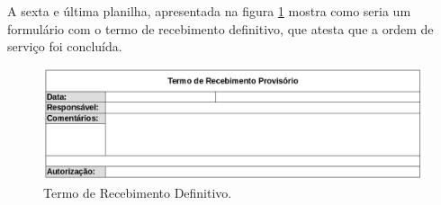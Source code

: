 A sexta e última planilha, apresentada na figura \ref{fig:prot_ack} mostra como
seria um formulário com o termo de recebimento definitivo, que atesta que a
ordem de serviço foi concluída.

\begin{figure}[H]
  \includegraphics[width=1.0\textwidth,natwidth=500,natheight=150]{figures/prot_ack.png}
  \caption{Termo de Recebimento Definitivo.}
  \label{fig:prot_ack}
\end{figure}
